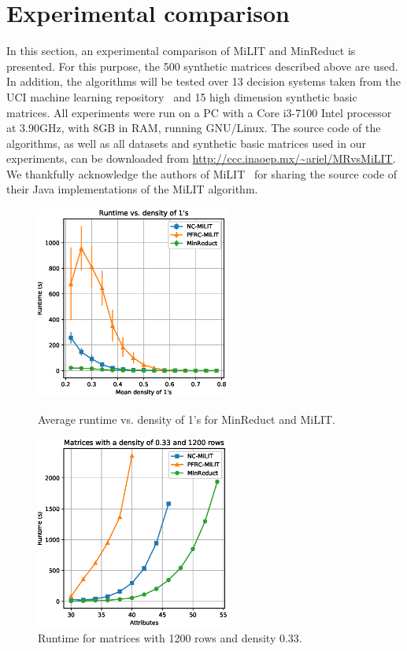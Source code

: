 \documentclass[citenumber]{llncs}
\begin{document}
%
\section{Experimental comparison}\label{Comparison}
%	
	In this section, an experimental comparison of MiLIT and MinReduct is presented. For this purpose, the 500 synthetic matrices described above are used. In addition, the algorithms will be tested over 13 decision systems taken from the UCI machine learning repository~\cite{Bache13} and 15 high dimension synthetic basic matrices. All experiments were run on a PC with a Core i3-7100 Intel processor at 3.90GHz, with 8GB in RAM, running GNU/Linux. The source code of the algorithms, as well as all datasets and synthetic basic matrices used in our experiments, can be downloaded from \url{http://ccc.inaoep.mx/~ariel/MRvsMiLIT}. We thankfully acknowledge the authors of MiLIT~\cite{Piza20} for sharing the source code of their Java implementations of the MiLIT algorithm. 	
	
	\begin{figure}[hbt] 
		\begin{minipage}[t]{.48\linewidth}
			\begin{center}
				\includegraphics[height=2.5in]{MinReduct_vs_milt.eps} 
			\end{center}
			\caption{Average runtime vs. density of 1’s for MinReduct and MiLIT.}\label{fig:sinthyetic}
		\end{minipage}
		\begin{minipage}[t]{.48\linewidth}
		\begin{center}
			\includegraphics[height=2.5in]{low_density_Minreduct_vs_MLIT.eps} 
		\end{center}
		\caption{Runtime for matrices with 1200 rows and density 0.33.}\label{fig:1200x110}
		\end{minipage}
	\end{figure}		
	
\end{document}
